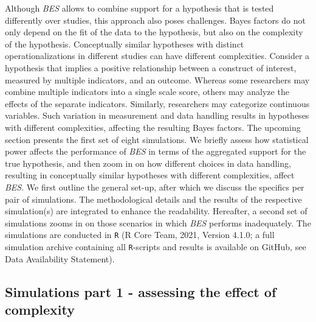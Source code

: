 \documentclass[
]{interact}
\begin{document}
Although \emph{BES} allows to combine support for a hypothesis that is
tested differently over studies, this approach also poses challenges.
Bayes factors do not only depend on the fit of the data to the
hypothesis, but also on the complexity of the hypothesis. Conceptually
similar hypotheses with distinct operationalizations in different
studies can have different complexities. Consider a hypothesis that
implies a positive relationship between a construct of interest,
measured by multiple indicators, and an outcome. Whereas some
researchers may combine multiple indicators into a single scale score,
others may analyze the effects of the separate indicators. Similarly,
researchers may categorize continuous variables. Such variation in
measurement and data handling results in hypotheses with different
complexities, affecting the resulting Bayes factors. The upcoming
section presents the first set of eight simulations. We briefly assess
how statistical power affects the performance of \emph{BES} in terms of
the aggregated support for the true hypothesis, and then zoom in on how
different choices in data handling, resulting in conceptually similar
hypotheses with different complexities, affect \emph{BES}. We first
outline the general set-up, after which we discuss the specifics per
pair of simulations. The methodological details and the results of the
respective simulation(s) are integrated to enhance the readability.
Hereafter, a second set of simulations zooms in on those scenarios in
which \emph{BES} performs inadequately. The simulations are conducted in
\texttt{R} (R Core Team, 2021, Version 4.1.0; a full simulation archive
containing all \texttt{R}-scripts and results is available on GitHub,
see Data Availability Statement).

\hypertarget{simulations-part-1---assessing-the-effect-of-complexity}{%
\subsection{Simulations part 1 - assessing the effect of
complexity}\label{simulations-part-1---assessing-the-effect-of-complexity}}
\end{document}
